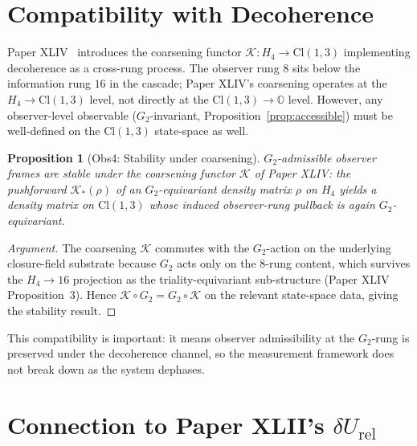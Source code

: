 \documentclass[12pt]{article}
\newtheorem{proposition}[theorem]{Proposition}
\theoremstyle{definition}
\theoremstyle{remark}
\newcommand{\Oo}{\mathbb{O}}
\newcommand{\Gtwo}{G_2}
\newcommand{\Cl}{\mathrm{Cl}}
\newcommand{\Kcal}{\mathcal{K}}
\begin{document}
\section{Compatibility with Decoherence}\label{sec:decoherence}

Paper XLIV~\citep{SmartXLIV} introduces the coarsening functor $\Kcal : H_4 \to \Cl(1,3)$ implementing decoherence as a cross-rung process. The observer rung $8$ sits below the information rung $16$ in the cascade; Paper XLIV's coarsening operates at the $H_4 \to \Cl(1,3)$ level, not directly at the $\Cl(1,3) \to \Oo$ level. However, any observer-level observable ($\Gtwo$-invariant, Proposition~\ref{prop:accessible}) must be well-defined on the $\Cl(1,3)$ state-space as well.

\begin{proposition}[Obs4: Stability under coarsening]\label{prop:coarsening-stable}
$\Gtwo$-admissible observer frames are stable under the coarsening functor $\Kcal$ of Paper XLIV: the pushforward $\Kcal_*(\rho)$ of an $\Gtwo$-equivariant density matrix $\rho$ on $H_4$ yields a density matrix on $\Cl(1,3)$ whose induced observer-rung pullback is again $\Gtwo$-equivariant.
\end{proposition}

\begin{proof}[Argument]
The coarsening $\Kcal$ commutes with the $\Gtwo$-action on the underlying closure-field substrate because $\Gtwo$ acts only on the $8$-rung content, which survives the $H_4 \to 16$ projection as the triality-equivariant sub-structure (Paper XLIV Proposition~3). Hence $\Kcal \circ \Gtwo = \Gtwo \circ \Kcal$ on the relevant state-space data, giving the stability result.
\end{proof}

This compatibility is important: it means observer admissibility at the $\Gtwo$-rung is preserved under the decoherence channel, so the measurement framework does not break down as the system dephases.

\section{Connection to Paper XLII's $\delta U_{\mathrm{rel}}$}\label{sec:dUrel}
\end{document}
